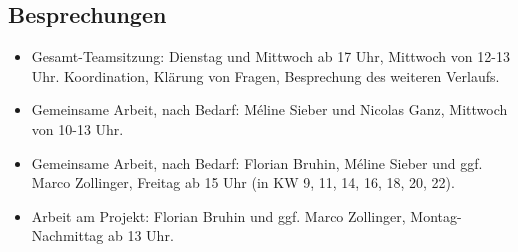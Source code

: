 \documentclass[a4paper]{article}
\begin{document}
\subsection{Besprechungen}
\begin{itemize}
\item Gesamt-Teamsitzung: Dienstag und Mittwoch ab 17 Uhr, Mittwoch von 12-13 Uhr. Koordination, Klärung von Fragen, Besprechung des weiteren Verlaufs.
\item Gemeinsame Arbeit, nach Bedarf: Méline Sieber und Nicolas Ganz, Mittwoch von 10-13 Uhr.
\item Gemeinsame Arbeit, nach Bedarf: Florian Bruhin, Méline Sieber und ggf. Marco Zollinger, Freitag ab 15 Uhr (in KW 9, 11, 14, 16, 18, 20, 22).
\item Arbeit am Projekt: Florian Bruhin und ggf. Marco Zollinger, Montag-Nachmittag ab 13 Uhr.
\end{itemize}
\end{document}
